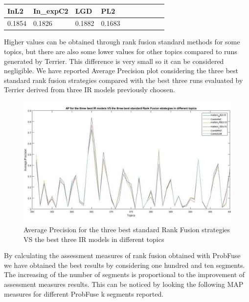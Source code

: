 \documentclass[12pt,journal]{IEEEtran}
\begin{document}
\begin{table}[h!]
\centering
\begin{tabular}{|l|l|l|l|l|l|l|l|l|l|}
\hline
InL2   & In\_expC2 & LGD    & PL2        \\ \hline
0.1854 & 0.1826    & 0.1882 & 0.1683      \\ \hline

\end{tabular}
\end{table}


Higher values can be obtained through rank fusion standard methods for some topics, but there are also some lower values for other topics compared to runs generated by Terrier. This difference is very small so it can be considered negligible. We have reported Average Precision plot considering the three best standard rank fusion strategies compared with the best three runs evaluated by Terrier derived from three IR models previously choosen.
\begin{figure}
\includegraphics[scale=0.32]{plot1}
\caption{Average Precision for the three best standard Rank Fusion strategies VS the best three IR models in different topics}
\label{Average Precision for the three best standard Rank Fusion strategies VS the best three IR models in different topics}
\end{figure}

By calculating the assessment measures of rank fusion obtained with ProbFuse we have obtained the best results by considering one hundred and ten segments. \\
The increasing of the number of segments is proportional to the improvement of assessment measures results. This can be noticed by looking the following MAP measures for different ProbFuse k segments reported. 
\end{document}
